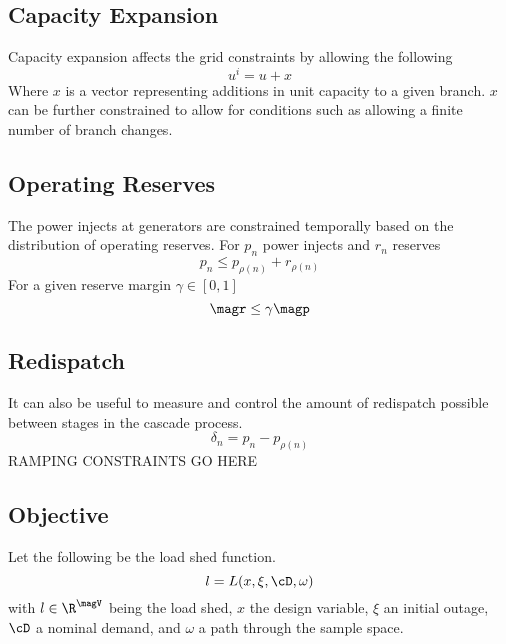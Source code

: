 \subsection{Capacity Expansion}
Capacity expansion affects the grid constraints by allowing the following
\begin{equation}\label{capexp}
	u^i = u + x
\end{equation}
Where $x$ is a vector representing additions in unit capacity to a given branch.  $x$ can be further constrained to allow for conditions such as allowing a finite number of branch changes.  

		


\subsection{Operating Reserves}
The power injects at generators are constrained temporally based on the distribution of operating reserves.  For $p_n$ power injects and $r_{n}$ reserves
\begin{equation}
	p_{n} \leq p_{ \rho (n) } + r_{ \rho (n) }
\end{equation}
For a given reserve margin $\gamma \in [0,1]$
\begin{equation}
	\magr\leq \gamma \magp
\end{equation}

\subsection{Redispatch}
It can also be useful to measure and control the amount of redispatch possible between stages in the cascade process.
\begin{equation}
	\delta_n = p_n - p_{ \rho (n) }
\end{equation}
RAMPING CONSTRAINTS GO HERE


\subsection{Objective}
Let the following be the load shed function.
\begin{equation}
  l = L(x, \xi, \cD, \omega )
\end{equation}
with $l \in \R^{\magV} $ being the load shed, $x$ the design variable, $\xi$ an initial outage, $\cD$ a nominal demand, and $\omega$ a path through the sample space.

